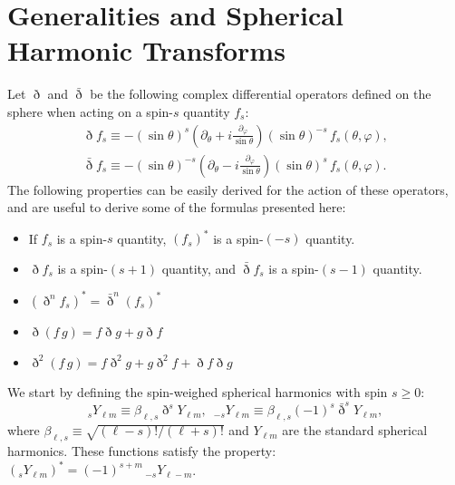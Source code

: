 \documentclass[usenatbib]{mnrasb}
\begin{document}







\appendix

  \section{Generalities and Spherical Harmonic Transforms}\label{app:shts}
    Let $\eth$ and $\bar{\eth}$ be the following complex differential operators defined on the sphere when acting on a spin-$s$ quantity $f_s$:
    \begin{equation}
      \begin{split}
        \eth f_s\equiv-(\sin\theta)^s\left(\partial_\theta+i\frac{\partial_\varphi}{\sin\theta}\right)(\sin\theta)^{-s}\,f_s(\theta,\varphi), \\
        \bar{\eth} f_s\equiv-(\sin\theta)^{-s}\left(\partial_\theta-i\frac{\partial_\varphi}{\sin\theta}\right)(\sin\theta)^{s}\,f_s(\theta,\varphi).
      \end{split}
    \end{equation}
    The following properties can be easily derived for the action of these operators, and are useful to derive some of the formulas presented here:
    \begin{itemize}
      \item If $f_s$ is a spin-$s$ quantity, $(f_s)^*$ is a spin-$(-s)$ quantity.
      \item $\eth f_s$ is a spin-$(s+1)$ quantity, and $\bar{\eth} f_s$ is a spin-$(s-1)$ quantity.
      \item $(\eth^nf_s)^*=\bar{\eth}^n(f_s)^*$
      \item $\eth(f\,g)=f\eth g+g\eth f$
      \item $\eth^2(f\,g)=f\eth^2g+g\eth^2f+\eth f\eth g$
    \end{itemize}
    
    We start by defining the spin-weighed spherical harmonics with spin $s\geq0$:
    \begin{equation}
      _sY_{\ell m}\equiv \beta_{\ell,s} \eth^s Y_{\ell m},\hspace{6pt}
      _{-s}Y_{\ell m}\equiv \beta_{\ell,s} (-1)^s\bar{\eth}^s Y_{\ell m},
    \end{equation}
    where $\beta_{\ell,s}\equiv\sqrt{(\ell-s)!/(\ell+s)!}$ and $Y_{\ell m}$ are the standard spherical harmonics. These functions satisfy the property: $(_sY_{\ell m})^*=(-1)^{s+m}\,_{-s}Y_{\ell-m}$. 
            
\end{document}
